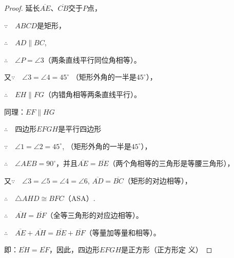\begin{proof}
延长$\overline{AE}$、$\overline{CB}$交于$P$点，

$\because\quad ABCD$是矩形，

$\therefore\quad AD\parallel BC$,

$\therefore\quad \angle P=\angle 3$（两条直线平行同位角相等）。

又$\because\quad \angle 3=\angle 4=45^{\circ}$ （矩形外角的一半是$45^{\circ}$），

$\therefore\quad EH\parallel FG$（内错角相等两条直线平行）。

同理：$EF\parallel HG$

$\therefore\quad $四边形$EFGH$是平行四边形

$\because\quad \angle 1=\angle 2=45^{\circ}$, （矩形外角的一半是$45^{\circ}$），

$\therefore\quad \angle AEB=90^{\circ}$，并且$\overline{AE}=\overline{BE}$（两个角相等的三角形是等腰三角形），

又$\because\quad \angle 3=\angle 5=\angle 4=\angle 6$, $\overline{AD}=\overline{BC}$（矩形的对边相等），

$\therefore\quad \triangle AHD\cong BFC$（ASA）.

$\therefore\quad \overline{AH}=\overline{BF}$（全等三角形的对应边相等）。

$\therefore\quad \overline{AE}+\overline{AH}=\overline{BE}+\overline{BF}$（等量加等量和相等）。    

即：$\overline{EH}=\overline{EF}$，因此，四边形$EFGH$是正方形（正方形定
义）
\end{proof}

